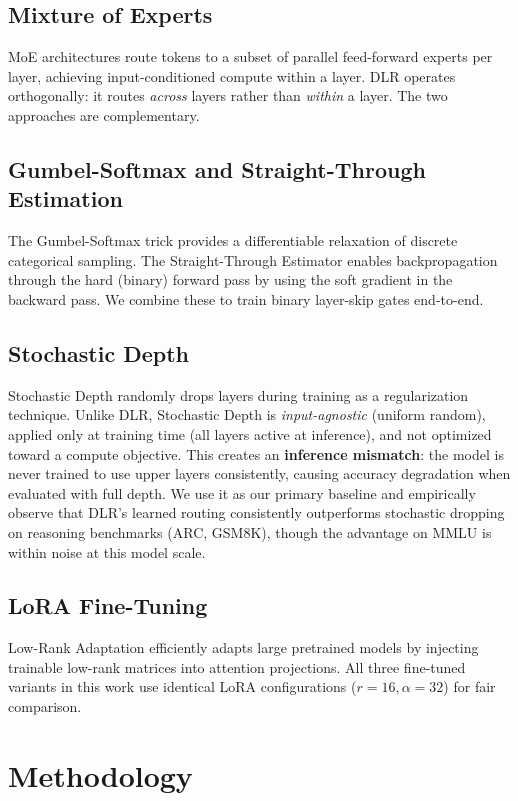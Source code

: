 \documentclass[conference]{IEEEtran}
\begin{document}
\subsection{Mixture of Experts}
MoE architectures \cite{shazeer2017, fedus2022} route tokens to a subset of parallel feed-forward experts per layer, achieving input-conditioned compute within a layer. DLR operates orthogonally: it routes \textit{across} layers rather than \textit{within} a layer. The two approaches are complementary.

\subsection{Gumbel-Softmax and Straight-Through Estimation}
The Gumbel-Softmax trick \cite{jang2017, maddison2017} provides a differentiable relaxation of discrete categorical sampling. The Straight-Through Estimator \cite{bengio2013} enables backpropagation through the hard (binary) forward pass by using the soft gradient in the backward pass. We combine these to train binary layer-skip gates end-to-end.

\subsection{Stochastic Depth}
Stochastic Depth \cite{huang2016} randomly drops layers during training as a regularization technique. Unlike DLR, Stochastic Depth is \textit{input-agnostic} (uniform random), applied only at training time (all layers active at inference), and not optimized toward a compute objective. This creates an \textbf{inference mismatch}: the model is never trained to use upper layers consistently, causing accuracy degradation when evaluated with full depth. We use it as our primary baseline and empirically observe that DLR's learned routing consistently outperforms stochastic dropping on reasoning benchmarks (ARC, GSM8K), though the advantage on MMLU is within noise at this model scale.

\subsection{LoRA Fine-Tuning}
Low-Rank Adaptation \cite{hu2022} efficiently adapts large pretrained models by injecting trainable low-rank matrices into attention projections. All three fine-tuned variants in this work use identical LoRA configurations ($r=16, \alpha=32$) for fair comparison.

\section{Methodology}
\end{document}
